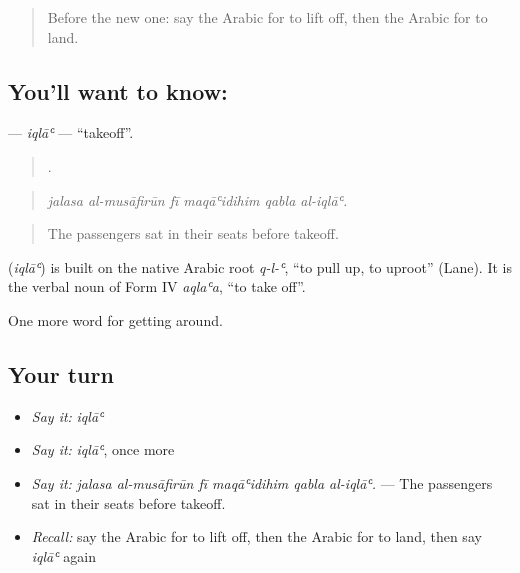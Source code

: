 \label{lesson:AR-C424-iqla}



\begin{quote}
Before the new one: say the Arabic for to lift off, then the Arabic for to land.
\end{quote}

\subsection*{You'll want to know: }
\textbf{} — \emph{iqlāʿ} — \textquotedblleft{}takeoff\textquotedblright{}.

\begin{quote}
     .
\end{quote}

\begin{quote}
\emph{jalasa al-musāfirūn fī maqāʿidihim qabla al-iqlāʿ.}
\end{quote}

\begin{quote}
The passengers sat in their seats before takeoff.
\end{quote}

\begin{cousinweb}
\textbf{} (\emph{iqlāʿ}) is built on the native Arabic root \emph{q-l-ʿ}, \textquotedblleft{}to pull up, to uproot\textquotedblright{} (Lane). It is the verbal noun of Form IV \emph{aqlaʿa}, \textquotedblleft{}to take off\textquotedblright{}.
\end{cousinweb}

\begin{grammarlens}[title={What you've built}]
One more word for getting around.
\end{grammarlens}

\subsection*{Your turn}
\begin{itemize}
\raggedright
  \item \emph{Say it:} \emph{iqlāʿ}
  \item \emph{Say it:} \emph{iqlāʿ}, once more
  \item \emph{Say it:} \emph{jalasa al-musāfirūn fī maqāʿidihim qabla al-iqlāʿ.} — The passengers sat in their seats before takeoff.
  \item \emph{Recall:} say the Arabic for to lift off, then the Arabic for to land, then say \emph{iqlāʿ} again
\end{itemize}

